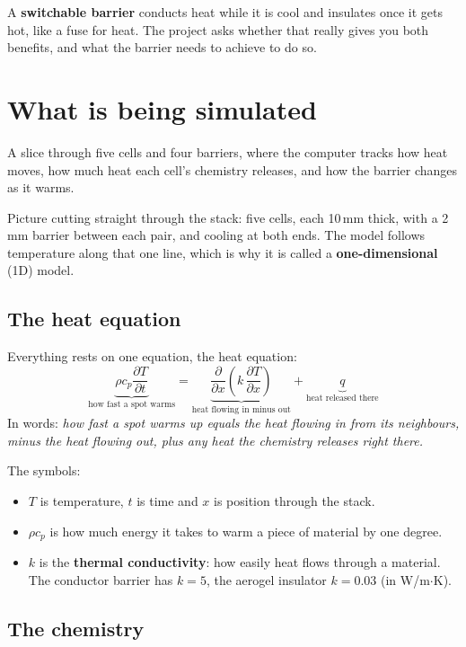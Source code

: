 \documentclass[11pt]{article}
\begin{document}
A \textbf{switchable barrier} conducts heat while it is cool and insulates once it gets
hot, like a fuse for heat. The project asks whether that really gives you both
benefits, and what the barrier needs to achieve to do so.

\section{What is being simulated}

\begin{idea}
A slice through five cells and four barriers, where the computer tracks how heat moves,
how much heat each cell's chemistry releases, and how the barrier changes as it warms.
\end{idea}

Picture cutting straight through the stack: five cells, each 10\,mm thick, with a 2\,mm
barrier between each pair, and cooling at both ends. The model follows temperature along
that one line, which is why it is called a \textbf{one-dimensional} (1D) model.

\subsection*{The heat equation}

Everything rests on one equation, the heat equation:
\[
  \underbrace{\rho c_p \frac{\partial T}{\partial t}}_{\text{how fast a spot warms}}
  = \underbrace{\frac{\partial}{\partial x}\!\left(k\,\frac{\partial T}{\partial x}\right)}_{\text{heat flowing in minus out}}
  + \underbrace{q}_{\text{heat released there}}
\]
In words: \emph{how fast a spot warms up equals the heat flowing in from its neighbours,
minus the heat flowing out, plus any heat the chemistry releases right there.}

The symbols:
\begin{itemize}
  \item $T$ is temperature, $t$ is time and $x$ is position through the stack.
  \item $\rho c_p$ is how much energy it takes to warm a piece of material by one degree.
  \item $k$ is the \textbf{thermal conductivity}: how easily heat flows through a material.
        The conductor barrier has $k = 5$, the aerogel insulator $k = 0.03$ (in W/m$\cdot$K).
\end{itemize}

\subsection*{The chemistry}
\end{document}
